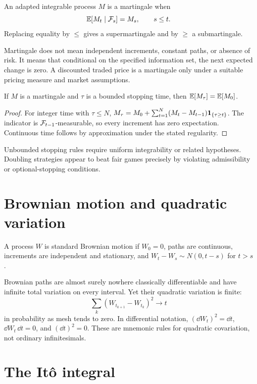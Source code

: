 \begin{definition}[Martingale]
An adapted integrable process $M$ is a martingale when
\[
\operatorname{\mathbb E}[M_t\mid\mathcal F_s]=M_s,\qquad s\leq t.
\]
Replacing equality by $\leq$ gives a supermartingale and by $\geq$ a submartingale.
\end{definition}

Martingale does not mean independent increments, constant paths, or absence of risk.
It means that conditional on the specified information set, the next expected
change is zero. A discounted traded price is a martingale only under a suitable
pricing measure and market assumptions.

\begin{theorem}
If $M$ is a martingale and $\tau$ is a bounded stopping time, then
$\operatorname{\mathbb E}[M_\tau]=\operatorname{\mathbb E}[M_0]$.
\end{theorem}
\begin{proof}
For integer time with $\tau\leq N$,
$M_\tau=M_0+\sum_{t=1}^N(M_t-M_{t-1})\mathbf 1_{\{\tau\geq t\}}$.
The indicator is $\mathcal F_{t-1}$-measurable, so every increment has zero expectation.
Continuous time follows by approximation under the stated regularity.
\end{proof}

Unbounded stopping rules require uniform integrability or related hypotheses.
Doubling strategies appear to beat fair games precisely by violating admissibility
or optional-stopping conditions.

\section{Brownian motion and quadratic variation}

\begin{definition}
A process $W$ is standard Brownian motion if $W_0=0$, paths are continuous,
increments are independent and stationary, and
$W_t-W_s\sim N(0,t-s)$ for $t>s$.
\end{definition}

Brownian paths are almost surely nowhere classically differentiable and have infinite
total variation on every interval. Yet their quadratic variation is finite:
\[
\sum_k(W_{t_{k+1}}-W_{t_k})^2\to t
\]
in probability as mesh tends to zero. In differential notation,
$(\dd W_t)^2=\dd t$, $\dd W_t\,\dd t=0$, and $(\dd t)^2=0$. These are mnemonic
rules for quadratic covariation, not ordinary infinitesimals.

\section{The Itô integral}

